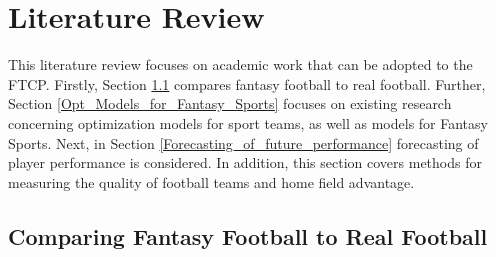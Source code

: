 
\chapter{Literature Review}
This literature review focuses on academic work that can be adopted to the FTCP. Firstly, Section \ref{Literature_fantasy_real} compares fantasy football to real football. Further, Section \ref{Opt_Models_for_Fantasy_Sports} focuses on existing research concerning optimization models for sport teams, as well as models for Fantasy Sports. Next, in Section \ref{Forecasting_of_future_performance} forecasting of player performance is considered. In addition, this section covers methods for measuring the quality of football teams and home field advantage.

\section{Comparing Fantasy Football to Real Football} \label{Literature_fantasy_real}


